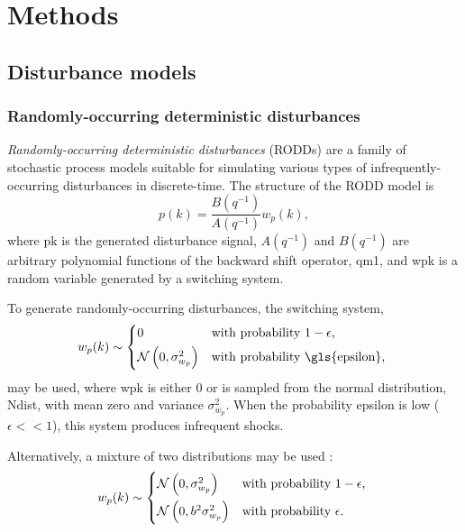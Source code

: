 \chapter{Methods}
\label{chap-methods}


\section{Disturbance models}

\subsection{Randomly-occurring deterministic disturbances}\label{subsec-RODD}

\textit{Randomly-occurring deterministic disturbances} (\gls{RODD}s) \citep{macgregor_duality_1984} are a family of stochastic process models suitable for simulating various types of infrequently-occurring disturbances in discrete-time.  The structure of the RODD model is
\begin{equation} \label{eq:RODD}
	p(k)= \frac{B(q^{-1})}{A(q^{-1})}w_p(k),
\end{equation}
where \gls{pk} is the generated disturbance signal, $A(q^{-1})$ and $B(q^{-1})$ are arbitrary polynomial functions of the backward shift operator, \gls{qm1}, and \gls{wpk} is a random variable generated by a switching system.

To generate randomly-occurring disturbances, the switching system,
\begin{equation} \label{eq:wpk1} 
w_p(k) \sim 
\begin{cases*}
	0 & with probability $1-\epsilon$, \\
	\mathcal{N}\left( 0, \sigma_{w_p}^2 \right) & with probability \gls{epsilon},
\end{cases*}
\end{equation}
may be used, where \gls{wpk} is either 0 or is sampled from the normal distribution, \gls{Ndist}, with mean zero and variance $\sigma_{w_p}^2$.  When the probability \gls{epsilon} is low ($\epsilon<<1$), this system produces infrequent shocks.

Alternatively, a mixture of two distributions may be used \citep{robertson_detection_1995}:
\begin{equation} \label{eq:wpk2}
w_p(k) \sim 
	\begin{cases*}
		\mathcal{N}\left(0, \sigma_{w_p}^2\right) & with probability $1-\epsilon$, \\
		\mathcal{N}\left(0, b^2\sigma_{w_p}^2\right) & with probability $\epsilon$.
	\end{cases*}
\end{equation}

